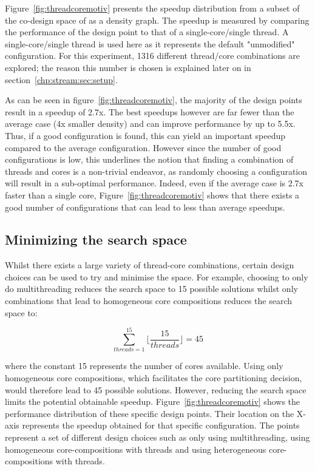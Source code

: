 Figure~\ref{fig:threadcoremotiv} presents the speedup distribution from a subset of the co-design space of  as a density graph.
The speedup is measured by comparing the performance of the design point to that of a single-core/single thread.
A single-core/single thread is used here as it represents the default "unmodified" configuration.
For this experiment, 1316 different thread/core combinations are explored; the reason this number is chosen is explained later on in section~\ref{chp:stream:sec:setup}.

As can be seen in figure~\ref{fig:threadcoremotiv}, the majority of the design points result in a speedup of 2.7x.
The best speedups however are far fewer than the average case (4x smaller density) and can improve performance by up to 5.5x.
Thus, if a good configuration is found, this can yield an important speedup compared to the average configuration.
However since the number of good configurations is low, this underlines the notion that finding a combination of threads and cores is a non-trivial endeavor, as randomly choosing a configuration will result in a sub-optimal performance.
Indeed, even if the average case is 2.7x faster than a single core, Figure~\ref{fig:threadcoremotiv} shows that there exists a good number of configurations that can lead to less than average speedups.

\subsection{Minimizing the search space}
Whilst there exists a large variety of thread-core combinations, certain design choices can be used to try and minimise the space.
For example, choosing to only do multithreading reduces the search space to 15 possible solutions whilst only combinations that lead to homogeneous core compositions reduces the search space to:

\begin{equation}
\sum_{threads=1}^{15} \lfloor\frac{15}{threads}\rfloor= 45
\end{equation}

where the constant 15 represents the number of cores available.
Using only homogeneous core compositions, which facilitates the core partitioning decision, would therefore lead to 45 possible solutions.
However, reducing the search space limits the potential obtainable speedup.
Figure~\ref{fig:threadcoremotiv} shows the performance distribution of these specific design points.
Their location on the X-axis represents the speedup obtained for that specific configuration.
The points represent a set of different design choices such as only using multithreading, using homogeneous core-compositions with threads and using heterogeneous core-compositions with threads.

